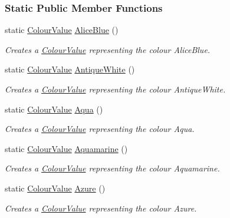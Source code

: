\subsubsection*{Static Public Member Functions}
\begin{DoxyCompactItemize}
\item 
static \hyperlink{classMezzanine_1_1ColourValue}{ColourValue} \hyperlink{classMezzanine_1_1ColourValue_a7af68d7fc76b55ab382040eb8abb6174}{AliceBlue} ()
\begin{DoxyCompactList}\small\item\em Creates a \hyperlink{classMezzanine_1_1ColourValue}{ColourValue} representing the colour AliceBlue. \item\end{DoxyCompactList}\item 
static \hyperlink{classMezzanine_1_1ColourValue}{ColourValue} \hyperlink{classMezzanine_1_1ColourValue_af41daccbf3910b811651bfce2b4c5aef}{AntiqueWhite} ()
\begin{DoxyCompactList}\small\item\em Creates a \hyperlink{classMezzanine_1_1ColourValue}{ColourValue} representing the colour AntiqueWhite. \item\end{DoxyCompactList}\item 
static \hyperlink{classMezzanine_1_1ColourValue}{ColourValue} \hyperlink{classMezzanine_1_1ColourValue_aaa845bd050ce8806018afcf19637d83c}{Aqua} ()
\begin{DoxyCompactList}\small\item\em Creates a \hyperlink{classMezzanine_1_1ColourValue}{ColourValue} representing the colour Aqua. \item\end{DoxyCompactList}\item 
static \hyperlink{classMezzanine_1_1ColourValue}{ColourValue} \hyperlink{classMezzanine_1_1ColourValue_ad197b5fb1436e5e3e6c43a1dd0eaff4f}{Aquamarine} ()
\begin{DoxyCompactList}\small\item\em Creates a \hyperlink{classMezzanine_1_1ColourValue}{ColourValue} representing the colour Aquamarine. \item\end{DoxyCompactList}\item 
static \hyperlink{classMezzanine_1_1ColourValue}{ColourValue} \hyperlink{classMezzanine_1_1ColourValue_a180b8fb1f2b7a6fdeef30e253f4589c8}{Azure} ()
\begin{DoxyCompactList}\small\item\em Creates a \hyperlink{classMezzanine_1_1ColourValue}{ColourValue} representing the colour Azure. \item\end{DoxyCompactList}\item 

\end{DoxyCompactItemize}
